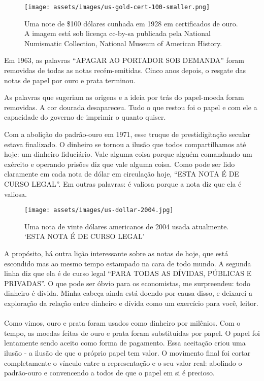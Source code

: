 \begin{figure}
  \centering
  \texttt{[image: assets/images/us-gold-cert-100-smaller.png]}
  \caption{Uma note de \$100 dólares cunhada em 1928 em certificados de ouro. A imagem está sob licença cc-by-sa publicada pela National Numismatic Collection, National Museum of American History.}
  \label{fig:us-gold-cert-100-smaller}
\end{figure}

Em 1963, as palavras \enquote{APAGAR AO PORTADOR SOB DEMANDA} foram removidas de todas as notas recém-emitidas. Cinco anos depois, o resgate das notas de papel por ouro e prata terminou.

As palavras que sugeriam as origens e a ideia por trás do papel-moeda foram removidas. A cor dourada desapareceu. Tudo o que restou foi o papel e com ele a capacidade do governo de imprimir o quanto quiser.

Com a abolição do padrão-ouro em 1971, esse truque de prestidigitação secular estava finalizado. O dinheiro se tornou a ilusão que todos compartilhamos até hoje: um dinheiro fiduciário. Vale alguma coisa porque alguém comandando um exército e operando prisões diz que vale alguma coisa. Como pode ser lido claramente em cada nota de dólar em circulação hoje, \enquote{ESTA NOTA É DE CURSO LEGAL}. Em outras palavras: é valiosa porque a nota diz que ela é valiosa.

\begin{figure}
  \centering
  \texttt{[image: assets/images/us-dollar-2004.jpg]}
  \caption{Uma nota de vinte dólares americanos de 2004 usada atualmente. `ESTA NOTA É DE CURSO LEGAL'}
  \label{fig:us-dollar-2004}
\end{figure}

A propósito, há outra lição interessante sobre as notas de hoje, que está escondido mas ao mesmo tempo estampado na cara de todo mundo. A segunda linha diz que ela é de curso legal \enquote{PARA TODAS AS DÍVIDAS, PÚBLICAS E PRIVADAS}. O que pode ser óbvio para os economistas, me surpreendeu: todo dinheiro é dívida. Minha cabeça ainda está doendo por causa disso, e deixarei a exploração da relação entre dinheiro e dívida como um exercício para você, leitor.

\paragraph{}
Como vimos, ouro e prata foram usados como dinheiro por milênios. Com o tempo, as moedas feitas de ouro e prata foram substituídas por papel. O papel foi lentamente sendo aceito como forma de pagamento. Essa aceitação criou uma ilusão - a ilusão de que o próprio papel tem valor. O movimento final foi cortar completamente o vínculo entre a representação e o seu valor real: abolindo o padrão-ouro e convencendo a todos de que o papel em si é precioso.


